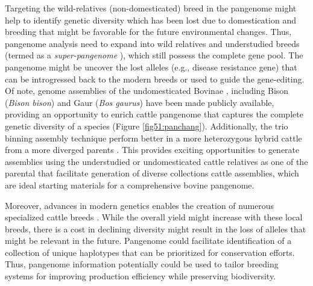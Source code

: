 \documentclass[../main.tex]{subfiles}
\begin{document}
Targeting the wild-relatives (non-domesticated) breed in the pangenome might help to identify genetic diversity which has been lost due to domestication and breeding that might be favorable for the future environmental changes. Thus, pangenome analysis need to expand into wild relatives and understudied breeds (termed as a \emph{super-pangenome} \citep{khan2020super}), which still possess the complete gene pool. The pangenome might be uncover the lost alleles (e.g., disease resistance gene) that can be introgressed back to the modern breeds or used to guide the gene-editing. Of note, genome assemblies of the undomesticated Bovinae \citep{wu2018pervasive}, including Bison (\emph{Bison bison})  and Gaur (\emph{Bos gaurus}) have been made publicly available, providing an opportunity to enrich cattle pangenome that captures the complete genetic diversity of a species (Figure \ref{fig51:panchang}). Additionally, the trio binning assembly technique perform better in a more heterozygous hybrid cattle from a more diverged parents \citep{rice2020continuous,heaton2021reference}. This provides exciting opportunities to generate assemblies using the understudied or undomesticated cattle relatives as one of the parental that facilitate generation of diverse collections cattle assemblies, which are ideal starting materials for a comprehensive bovine pangenome. 

Moreover, advances in modern genetics enables the creation of numerous specialized cattle breeds \citep{signer2017population,upadhyay2019genomic}. While the overall yield might increase with these local breeds, there is a cost in declining diversity might result in the loss of alleles that might be relevant in the future. Pangenome could facilitate identification of a collection of unique haplotypes that can be prioritized for conservation efforts. Thus, pangenome information potentially could be used to tailor breeding systems for improving production efficiency while preserving biodiversity.


\singlespacing
\footnotesize






\ifdefined\BuildingFromMainFile
\else
   
\end{document}
